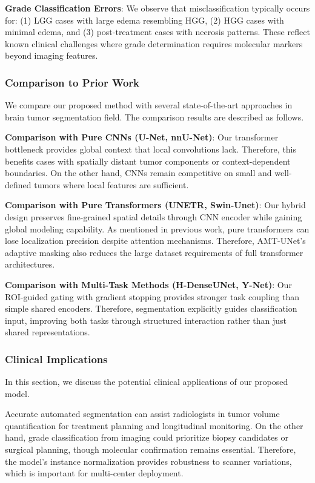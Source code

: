 \documentclass[runningheads]{llncs}
\begin{document}
\textbf{Grade Classification Errors}: We observe that misclassification typically occurs for: (1) LGG cases with large edema resembling HGG, (2) HGG cases with minimal edema, and (3) post-treatment cases with necrosis patterns. These reflect known clinical challenges where grade determination requires molecular markers beyond imaging features.

\subsubsection{Comparison to Prior Work}

We compare our proposed method with several state-of-the-art approaches in brain tumor segmentation field. The comparison results are described as follows.

\textbf{Comparison with Pure CNNs (U-Net, nnU-Net)}: Our transformer bottleneck provides global context that local convolutions lack. Therefore, this benefits cases with spatially distant tumor components or context-dependent boundaries. On the other hand, CNNs remain competitive on small and well-defined tumors where local features are sufficient.

\textbf{Comparison with Pure Transformers (UNETR, Swin-Unet)}: Our hybrid design preserves fine-grained spatial details through CNN encoder while gaining global modeling capability. As mentioned in previous work, pure transformers can lose localization precision despite attention mechanisms. Therefore, AMT-UNet's adaptive masking also reduces the large dataset requirements of full transformer architectures.

\textbf{Comparison with Multi-Task Methods (H-DenseUNet, Y-Net)}: Our ROI-guided gating with gradient stopping provides stronger task coupling than simple shared encoders. Therefore, segmentation explicitly guides classification input, improving both tasks through structured interaction rather than just shared representations.

\subsubsection{Clinical Implications}

In this section, we discuss the potential clinical applications of our proposed model.

Accurate automated segmentation can assist radiologists in tumor volume quantification for treatment planning and longitudinal monitoring. On the other hand, grade classification from imaging could prioritize biopsy candidates or surgical planning, though molecular confirmation remains essential. Therefore, the model's instance normalization provides robustness to scanner variations, which is important for multi-center deployment.
\end{document}
